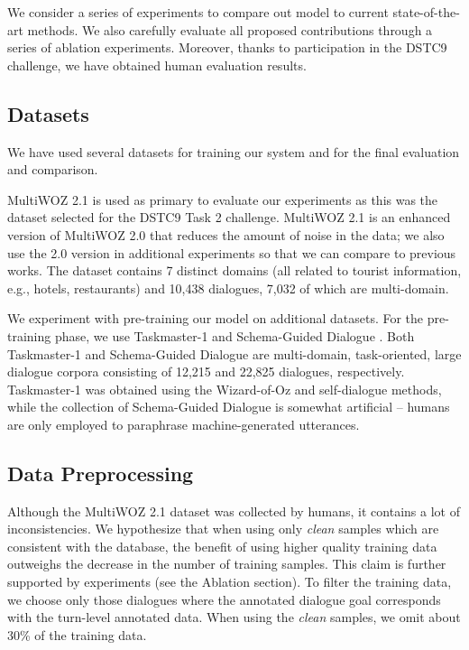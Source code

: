 \documentclass[letterpaper]{article} %
\newcommand{\multiwoz}[0]{MultiWOZ 2.0 }
\newcommand{\multiwozn}[0]{MultiWOZ 2.1 }
\newcommand{\taskmaster}[0]{Taskmaster-1 }
\newcommand{\schema}[0]{Schema-Guided Dialogue }
\begin{document}
We consider a series of experiments to compare out model to current state-of-the-art methods.
We also carefully evaluate all proposed contributions through a series of ablation experiments.
Moreover, thanks to participation in the DSTC9 challenge, we have obtained human evaluation results.

\subsection{Datasets}
We have used several datasets for training our system and for the final evaluation and comparison. 

\multiwozn \cite{eric2019} is used as primary to evaluate our experiments as this was the dataset selected for the DSTC9 Task 2 challenge.
\multiwozn is an enhanced version of \multiwoz \cite{budzianowski2018} that reduces the amount of noise in the data; we also use the 2.0 version in additional experiments so that we can compare to previous works.
The dataset contains 7 distinct domains (all related to tourist information, e.g., hotels, restaurants) and 10,438 dialogues, 7,032 of which are multi-domain.


We experiment with pre-training our model on additional datasets.
For the pre-training phase, we use \taskmaster \cite{byrne2019} and \schema \cite{rastogi2019}.
Both \taskmaster and \schema are multi-domain, task-oriented, large dialogue corpora consisting of 12,215 and 22,825 dialogues, respectively.
\taskmaster was obtained using the Wizard-of-Oz and self-dialogue methods, while the collection of \schema is somewhat artificial -- humans are only employed to paraphrase machine-generated utterances.


\subsection{Data Preprocessing}\label{sec:preprocessing}

Although the MultiWOZ 2.1 dataset was collected by humans, it contains a lot of inconsistencies. We hypothesize that when using only \textit{clean} samples which are consistent with the database, the benefit of using higher quality training data outweighs the decrease in the number of training samples. This claim is further supported by experiments (see the Ablation section). To filter the training data, we choose only those dialogues where the annotated dialogue goal corresponds with the turn-level annotated data. When using the \emph{clean} samples, we omit about 30\% of the training data.
\end{document}
